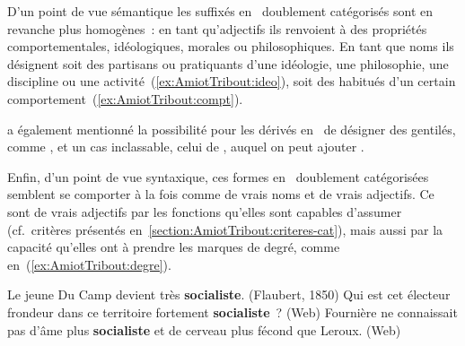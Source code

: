 \documentclass[output=paper]{LSP/langsci}
\begin{document}
\begin{exe}
\ex \label{ex:AmiotTribout:base-ambigue} 

\ex \label{ex:AmiotTribout:deriv-V-N} 
\end{exe}

D'un point de vue sémantique  les suffixés en \iste\ doublement catégorisés sont en revanche plus homogènes~: en tant qu'adjectifs ils renvoient à des propriétés comportementales, idéologiques, morales ou philosophiques. En tant que noms ils désignent soit des partisans ou pratiquants d'une idéologie, une philosophie, une discipline ou une activité~(\ref{ex:AmiotTribout:ideo}), soit des habitués d'un certain comportement~(\ref{ex:AmiotTribout:compt}).

\begin{exe}
\ex \label{ex:AmiotTribout:ideo} 
\ex \label{ex:AmiotTribout:compt}  
\end{exe}

\cite{roche11} a également mentionné la possibilité pour les dérivés en \iste\ de désigner des gentilés, comme , et un cas inclassable, celui de , auquel on peut ajouter . 


Enfin, d'un point de vue syntaxique, ces formes en \iste\ doublement catégorisées semblent se comporter à la fois comme de vrais noms et de vrais adjectifs. Ce sont de vrais adjectifs par les fonctions qu'elles sont capables d'assumer (cf.~critères présentés en~\ref{section:AmiotTribout:criteres-cat}), mais aussi par la capacité qu'elles ont à prendre les marques de degré, comme en~(\ref{ex:AmiotTribout:degre}).

\begin{exe}
\ex \label{ex:AmiotTribout:degre}
\begin{xlist}
\ex Le jeune Du Camp devient très \textbf{socialiste}. (Flaubert, 1850)
\ex Qui est cet électeur frondeur dans ce territoire fortement \textbf{socialiste}~? (Web)
\ex Fournière ne connaissait pas d'âme plus \textbf{socialiste}  et de cerveau plus fécond que Leroux. (Web)
\end{xlist}
\end{exe}
\end{document}
